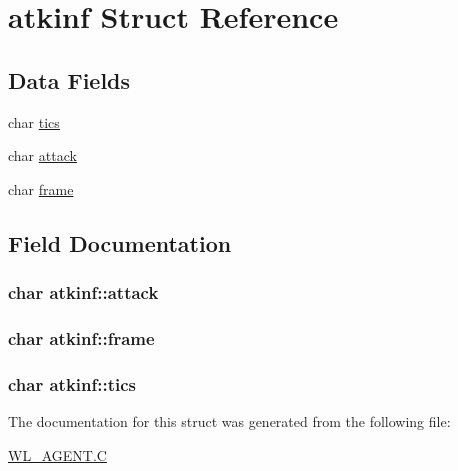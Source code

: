 \hypertarget{structatkinf}{
\section{atkinf Struct Reference}
\label{structatkinf}
}
\subsection*{Data Fields}
\begin{DoxyCompactItemize}
\item 
char \hyperlink{structatkinf_a11c0ced4af2217aa02777ae06d3a68d0}{tics}
\item 
char \hyperlink{structatkinf_a9660ead1c148b3346dccdc0916213c85}{attack}
\item 
char \hyperlink{structatkinf_a3aff7cb1d565ced93c9958b4cd0cc0de}{frame}
\end{DoxyCompactItemize}


\subsection{Field Documentation}
\hypertarget{structatkinf_a9660ead1c148b3346dccdc0916213c85}{
\subsubsection[{attack}]{\setlength{\rightskip}{0pt plus 5cm}char {\bf atkinf::attack}}}
\label{structatkinf_a9660ead1c148b3346dccdc0916213c85}
\hypertarget{structatkinf_a3aff7cb1d565ced93c9958b4cd0cc0de}{
\subsubsection[{frame}]{\setlength{\rightskip}{0pt plus 5cm}char {\bf atkinf::frame}}}
\label{structatkinf_a3aff7cb1d565ced93c9958b4cd0cc0de}
\hypertarget{structatkinf_a11c0ced4af2217aa02777ae06d3a68d0}{
\subsubsection[{tics}]{\setlength{\rightskip}{0pt plus 5cm}char {\bf atkinf::tics}}}
\label{structatkinf_a11c0ced4af2217aa02777ae06d3a68d0}


The documentation for this struct was generated from the following file:\begin{DoxyCompactItemize}
\item 
\hyperlink{WL__AGENT_8C}{WL\_\-AGENT.C}\end{DoxyCompactItemize}

